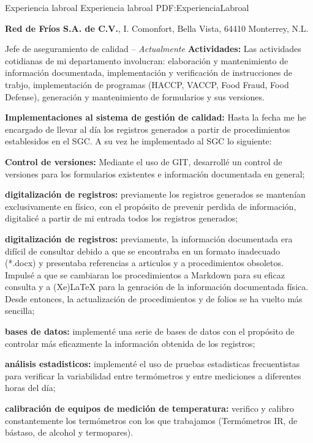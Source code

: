 \newpage
\Section
{Experiencia labroal}
{Experiencia labroal}
{PDF:ExperienciaLabroal}



\Entry
{\textbf{Red de Fríos S.A. de C.V.}},
\newline
I. Comonfort, Bella Vista, 64410 Monterrey, N.L.

\Gap
\BulletItem
Jefe de aseguramiento de calidad
\hfill
{} -- \textit{Actualmente}
\newline
\BulletItem \textbf{Actividades:}
Las actividades cotidianas de mi departamento involucran: \compac elaboración y mantenimiento de información documentada, implementación y verificación de instrucciones de trabjo, implementación de programas (HACCP, VACCP, Food Fraud, Food Defense), generación y mantenimiento de formularios y sus versiones.

\newline
\BulletItem \textbf{Implementaciones al sistema de gestión de calidad:}
Hasta la fecha me he encargado de llevar al día los registros generados a partir de procedimientos establesidos en el SGC. A su vez he implementado al SGC lo siguiente:
\begin{compactitem}[$\textendash$]
    \item \textbf{Control de versiones:} Mediante el uso de GIT, desarrollé un control de versiones para los formularios existentes e información documentada en general; 
    \item \textbf{digitalización de registros:} previamente los registros generados se mantenían exclusivamente en físico, con el propósito de prevenir perdida de información, digitalicé a partir de mi entrada todos los registros generados;
    \item \textbf{digitalización de registros:} previamente, la información documentada era difícil de consultar debido a que se encontraba en un formato inadecuado (*.docx) y presentaba referencias a articulos y a procedimientos obsoletos. Impulsé a que se cambiaran los procedimientos a Markdown para su eficaz consulta y a (Xe)LaTeX para la genración de la información documentada física. Desde entonces, la actualización de procedimientos y de folios se ha vuelto más sencilla;
    \item \textbf{bases de datos:} implementé una serie de bases de datos con el propósito de controlar más eficazmente la información obtenida de los registros;
    \item \textbf{análisis estadisticos:} implementé el uso de pruebas estadisticas frecuentistas para verificar la variabilidad entre termómetros y entre mediciones a diferentes horas del día;
    \item \textbf{calibración de equipos de medición de temperatura:} verifico y calibro constantemente los termómetros con los que trabajamos (Termómetros IR, de bástaso, de alcohol y termopares).
\end{compactitem}